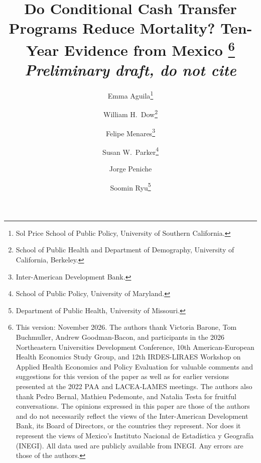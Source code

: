 \documentclass[12pt]{article}
\begin{document}


\title{\Large{Do Conditional Cash Transfer Programs Reduce Mortality? Ten-Year Evidence from Mexico}
\thanks{This version: November 2026. The authors thank Victoria Barone, Tom Buchmuller, Andrew Goodman-Bacon, and participants in the 2026 Northeastern Universities Development Conference, 10th American-European Health Economics Study Group, and 12th IRDES-LIRAES Workshop on Applied Health Economics and Policy Evaluation for valuable comments and suggestions for this version of the paper as well as for earlier versions presented at the 2022 PAA and LACEA-LAMES meetings. The authors also thank Pedro Bernal, Mathieu Pedemonte, and Natalia Testa for fruitful conversations. The opinions expressed in this paper are those of the authors and do not necessarily reflect the views of the Inter-American Development Bank, its Board of Directors, or the countries they represent. Nor does it represent the views of Mexico's Instituto Nacional de Estad\'istica y Geograf\'ia (INEGI). All data used are publicly available from INEGI. Any errors are those of the authors.}\\ \textit{Preliminary draft, do not cite}}

\author{Emma Aguila\footnote{Sol Price School of Public Policy, University of Southern California.}
\and William H.\ Dow\footnote{School of Public Health and Department of Demography, University of California, Berkeley.}
\and Felipe Menares\footnote{Inter-American Development Bank.}
\and Susan W.\ Parker\footnote{School of Public Policy, University of Maryland.}
\and Jorge Peniche\footnotemark[2]
\and Soomin Ryu\footnote{Department of Public Health, University of Missouri.}}

\date{}
\maketitle
\vspace{-12mm}
\thispagestyle{empty}

\end{document}
